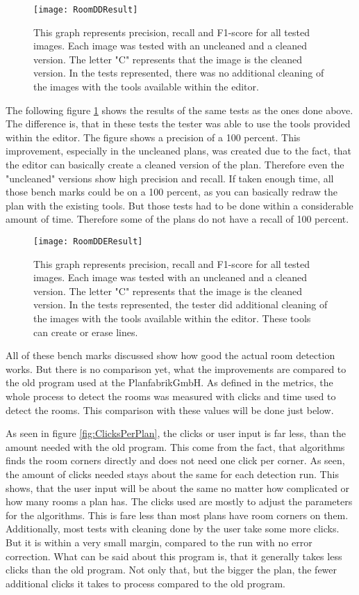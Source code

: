 \begin{figure}[H]
	\centering
	\texttt{[image: RoomDDResult]}
	\caption{This graph represents precision, recall and F1-score for all tested images. Each image was tested with an uncleaned and a cleaned version. The letter "C" represents that the image is the cleaned version. In the tests represented, there was no additional cleaning of the images with the tools available within the editor. }
	\label{fig:RoomDDResult}
\end{figure}

The following figure \ref{fig:RoomDDResult} shows the results of the same tests as the ones done above. The difference is, that in these tests the tester was able to use the tools provided within the editor. The figure shows a precision of a 100 percent. This improvement, especially in the uncleaned plans, was created due to the fact, that the editor can basically create a cleaned version of the plan. Therefore even the "uncleaned" versions show high precision and recall. If taken enough time, all those bench marks could be on a 100 percent, as you can basically redraw the plan with the existing tools. But those tests had to be done within a considerable amount of time. Therefore some of the plans do not have a recall of 100 percent.

\begin{figure}[H]
	\centering
	\texttt{[image: RoomDDEResult]}
	\caption{This graph represents precision, recall and F1-score for all tested images. Each image was tested with an uncleaned and a cleaned version. The letter "C" represents that the image is the cleaned version. In the tests represented, the tester did additional cleaning of the images with the tools available within the editor. These tools can create or erase lines. }
	\label{fig:RoomDDEResult}
\end{figure}

All of these bench marks discussed show how good the actual room detection works. But there is no comparison yet, what the improvements are compared to the old program used at the PlanfabrikGmbH. As defined in the metrics, the whole process to detect the rooms was measured with clicks and time used to detect the rooms. This comparison with these values will be done just below.

As seen in figure \ref{fig:ClicksPerPlan}, the clicks or user input is far less, than the amount needed with the old program. This come from the fact, that algorithms finds the room corners directly and does not need one click per corner. As seen, the amount of clicks needed stays about the same for each detection run. This shows, that the user input will be about the same no matter how complicated or how many rooms a plan has. The clicks used are mostly to adjust the parameters for the algorithms. This is fare less than most plans have room corners on them. Additionally, most tests with cleaning done by the user take some more clicks. But it is within a very small margin, compared to the run with no error correction. What can be said about this program is, that it generally takes less clicks than the old program. Not only that, but the bigger the plan, the fewer additional clicks it takes to process compared to the old program. 

